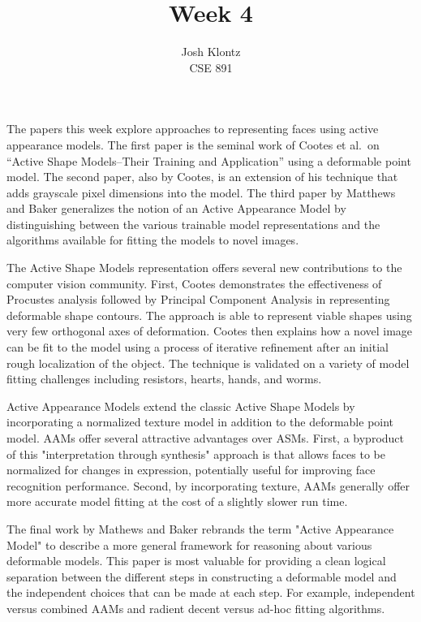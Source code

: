 \documentclass[12pt]{article}
\begin{document}
 
\title{Week 4}
\author{Josh Klontz\\CSE 891}
 
\maketitle
 
The papers this week explore approaches to representing faces using active appearance models.
The first paper is the seminal work of Cootes et al.\ on ``Active Shape Models--Their Training and Application'' using a deformable point model.
The second paper, also by Cootes, is an extension of his technique that adds grayscale pixel dimensions into the model.
The third paper by Matthews and Baker generalizes the notion of an Active Appearance Model by distinguishing between the various trainable model representations and the algorithms available for fitting the models to novel images.
\par
The Active Shape Models representation offers several new contributions to the computer vision community.
First, Cootes demonstrates the effectiveness of Procustes analysis followed by Principal Component Analysis in representing deformable shape contours.
The approach is able to represent viable shapes using very few orthogonal axes of deformation.
Cootes then explains how a novel image can be fit to the model using a process of iterative refinement after an initial rough localization of the object.
The technique is validated on a variety of model fitting challenges including resistors, hearts, hands, and worms.
\par
Active Appearance Models extend the classic Active Shape Models by incorporating a normalized texture model in addition to the deformable point model.
AAMs offer several attractive advantages over ASMs.
First, a byproduct of this "interpretation through synthesis" approach is that allows faces to be normalized for changes in expression, potentially useful for improving face recognition performance.
Second, by incorporating texture, AAMs generally offer more accurate model fitting at the cost of a slightly slower run time.
\par
The final work by Mathews and Baker rebrands the term "Active Appearance Model" to describe a more general framework for reasoning about various deformable models.
This paper is most valuable for providing a clean logical separation between the different steps in constructing a deformable model and the independent choices that can be made at each step.
For example, independent versus combined AAMs and radient decent versus ad-hoc fitting algorithms.
\end{document}
